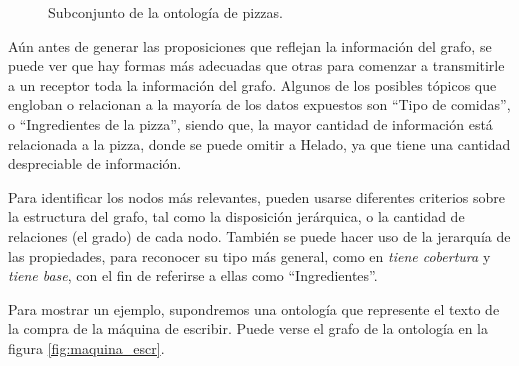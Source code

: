 \begin{figure}
\centering
{}
\caption{Subconjunto de la ontología de pizzas.} \label{fig:pizza.owl}
\end{figure}

Aún antes de generar las proposiciones que reflejan la información del grafo, se puede ver que hay formas más adecuadas que otras para comenzar a transmitirle a un receptor toda la información del grafo. Algunos de los posibles tópicos que engloban o relacionan a la mayoría de los datos expuestos son ``Tipo de comidas'', o ``Ingredientes de la pizza'', siendo que, la mayor cantidad de información está relacionada a la pizza, donde se puede omitir a Helado, ya que tiene una cantidad despreciable de información. 

Para identificar los nodos más relevantes, pueden usarse diferentes criterios sobre la estructura del grafo, tal como la disposición jerárquica, o la cantidad de relaciones (el grado) de cada nodo. También se puede hacer uso de la jerarquía de las propiedades, para reconocer su tipo más general, como en \emph{tiene cobertura} y \emph{tiene base}, con el fin de referirse a ellas como ``Ingredientes''.

Para mostrar un ejemplo, supondremos una ontología que represente el texto de la compra de la máquina de escribir. Puede verse el grafo de la ontología en la figura \ref{fig:maquina_escr}.

